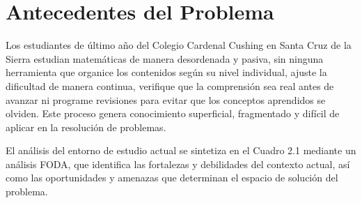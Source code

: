 \documentclass{univalle-perfil}
\begin{document}
\section{Antecedentes del Problema}

Los estudiantes de último año del Colegio Cardenal Cushing en Santa Cruz de la Sierra estudian matemáticas de manera desordenada y pasiva, sin ninguna herramienta que organice los contenidos según su nivel individual, ajuste la dificultad de manera continua, verifique que la comprensión sea real antes de avanzar ni programe revisiones para evitar que los conceptos aprendidos se olviden. Este proceso genera conocimiento superficial, fragmentado y difícil de aplicar en la resolución de problemas.

El análisis del entorno de estudio actual se sintetiza en el Cuadro 2.1 mediante un análisis FODA, que identifica las fortalezas y debilidades del contexto actual, así como las oportunidades y amenazas que determinan el espacio de solución del problema.
\end{document}
